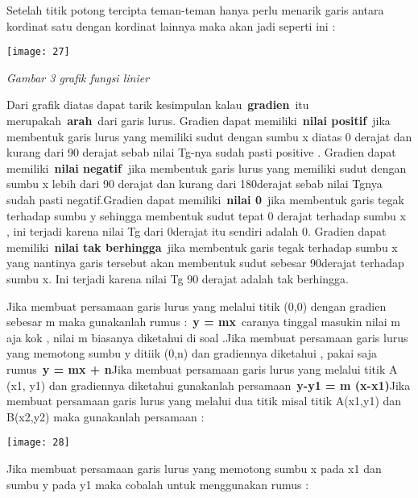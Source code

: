 \documentclass[11pt,fleqn]{book} %
\begin{document}
\begin{myEnumerate}
\begin{itemize}
\noindent Setelah titik potong tercipta teman-teman hanya perlu menarik garis antara kordinat satu dengan kordinat lainnya maka akan jadi seperti ini :

\begin{center}
\noindent \texttt{[image: 27]}
\end{center}

\textit{Gambar 3 grafik fungsi linier}

\noindent 

\noindent Dari grafik diatas dapat tarik kesimpulan kalau~\textbf{gradien}~itu merupakah~\textbf{arah}~dari garis lurus. Gradien dapat memiliki~\textbf{nilai positif}~jika membentuk garis lurus yang memiliki sudut dengan sumbu x diatas 0 derajat dan kurang dari 90 derajat sebab nilai Tg-nya sudah pasti positive . Gradien dapat memiliki~\textbf{nilai negatif~}jika membentuk garis lurus yang memiliki sudut dengan sumbu x lebih dari 90 derajat dan kurang dari 180derajat sebab nilai Tgnya sudah pasti negatif.Gradien dapat memiliki~\textbf{nilai 0}~jika membentuk garis tegak terhadap sumbu y sehingga membentuk sudut tepat 0 derajat terhadap sumbu x , ini terjadi karena nilai Tg dari 0derajat itu sendiri adalah 0. Gradien dapat memiliki~\textbf{nilai tak berhingga}~jika membentuk garis tegak terhadap sumbu x yang nantinya garis tersebut akan membentuk sudut sebesar 90derajat terhadap sumbu x. Ini terjadi karena nilai Tg 90 derajat adalah tak berhingga.

\noindent Jika membuat persamaan garis lurus yang melalui titik (0,0) dengan gradien sebesar m maka gunakanlah rumus :~\textbf{y = mx}~caranya tinggal masukin nilai m aja kok , nilai m biasanya diketahui di soal .Jika membuat persamaan garis lurus yang memotong sumbu y ditiik (0,n) dan gradiennya diketahui , pakai saja rumus~\textbf{y = mx + n}Jika membuat persamaan garis lurus yang melalui titik A (x1, y1) dan gradiennya diketahui gunakanlah persamaan~\textbf{y-y1 = m (x-x1)}Jika membuat persamaan garis lurus yang melalui dua titik misal titik A(x1,y1) dan B(x2,y2) maka gunakanlah persamaan :

\begin{center}
\noindent \texttt{[image: 28]}
\end{center}

\noindent Jika membuat persamaan garis lurus yang memotong sumbu x pada x1 dan sumbu y pada y1 maka cobalah untuk menggunakan rumus :


\end{itemize}
\end{myEnumerate}
\end{document}
